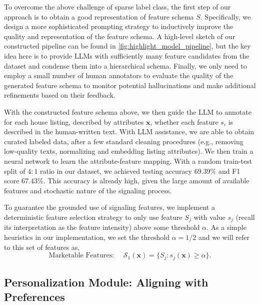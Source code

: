 To overcome the above challenge of sparse label class, the first step of our approach is to obtain a good representation of feature schema $S$.  
Specifically, we design a more sophisticated prompting strategy to inductively improve the quality and representation of the feature schema.  A high-level sketch of our constructed pipeline can be found in \cref{fig:highlight_model_pipeline}, but the key idea here is to provide LLMs with sufficiently many feature candidates from the dataset and condense them into a hierarchical schema. Finally, we only need to employ a small number of human annotators to evaluate the quality of the generated feature schema to monitor potential hallucinations and make additional refinements based on their feedback. 

With the constructed feature schema above, we then guide the LLM to annotate for each house listing, described by attributes $\mathbf{x}$, whether each feature ${s}_i$ is described in the human-written text.  With LLM assistance, we are able to obtain curated labeled data, after a few standard cleaning procedures (e.g., removing low-quality texts, normalizing and embedding listing attributes).  We then train a neural network to learn the attribute-feature mapping. With a random train-test split of $4:1$ ratio in our dataset, we achieved testing accuracy $69.39\%$ and F1 score $67.43\%$. This accuracy is already high, given the large amount of available features and stochastic nature of the signaling process.

To guarantee the grounded use of signaling features, we implement a deterministic feature selection strategy to only use feature $S_j$ with value $s_j$ (recall its interpretation as the feature intensity)  above some threshold $\alpha$.
As a simple heuristics in our implementation, we set the threshold $\alpha=1/2$ and we will refer to this set of features as, 
\begin{equation}\label{eq:marketable-feature}
     \text{Marketable Features: } \quad  \mathcal{S}_1(\mathbf{x}) = \{S_j:  s_j(\mathbf{x}) \geq \alpha \}.
 \end{equation}

\subsection{Personalization Module: Aligning with Preferences}
\label{sec: user_preference}

